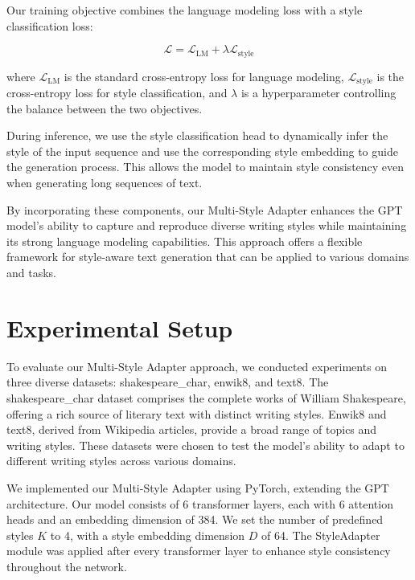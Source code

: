 \documentclass{article} %
\begin{document}
Our training objective combines the language modeling loss with a style classification loss:

\begin{equation}
    \mathcal{L} = \mathcal{L}_{\text{LM}} + \lambda \mathcal{L}_{\text{style}}
\end{equation}

where $\mathcal{L}_{\text{LM}}$ is the standard cross-entropy loss for language modeling, $\mathcal{L}_{\text{style}}$ is the cross-entropy loss for style classification, and $\lambda$ is a hyperparameter controlling the balance between the two objectives.

During inference, we use the style classification head to dynamically infer the style of the input sequence and use the corresponding style embedding to guide the generation process. This allows the model to maintain style consistency even when generating long sequences of text.

By incorporating these components, our Multi-Style Adapter enhances the GPT model's ability to capture and reproduce diverse writing styles while maintaining its strong language modeling capabilities. This approach offers a flexible framework for style-aware text generation that can be applied to various domains and tasks.

\section{Experimental Setup}
\label{sec:experimental}

To evaluate our Multi-Style Adapter approach, we conducted experiments on three diverse datasets: shakespeare\_char, enwik8, and text8. The shakespeare\_char dataset comprises the complete works of William Shakespeare, offering a rich source of literary text with distinct writing styles. Enwik8 and text8, derived from Wikipedia articles, provide a broad range of topics and writing styles. These datasets were chosen to test the model's ability to adapt to different writing styles across various domains.

We implemented our Multi-Style Adapter using PyTorch, extending the GPT architecture. Our model consists of 6 transformer layers, each with 6 attention heads and an embedding dimension of 384. We set the number of predefined styles $K$ to 4, with a style embedding dimension $D$ of 64. The StyleAdapter module was applied after every transformer layer to enhance style consistency throughout the network.
\end{document}
